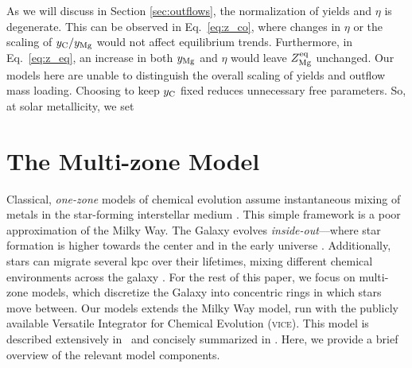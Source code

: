 \documentclass[fleqn,usenatbib]{mnras}
\newcommand{\JJ}{\citetalias{james+21}}
\newcommand{\VICE}{\textsc{vice}}
\begin{document}
As we will discuss in Section \ref{sec:outflows}, the normalization of yields and $\eta$ is degenerate. This can be observed in Eq.~\ref{eq:z_co}, where changes in $\eta$ or the scaling of $y_{\rm C}/y_{\rm Mg}$ would not affect equilibrium trends. Furthermore, in Eq.~\ref{eq:z_eq}, an increase in both $y_{\rm Mg}$ and $\eta$ would leave $Z_{\rm Mg}^{\rm eq}$ unchanged. Our models here are unable to distinguish the overall scaling of yields and outflow mass loading. Choosing to keep $y_{\rm C}$ fixed reduces unnecessary free parameters. So, at solar metallicity, we set


\section{The Multi-zone Model}\label{sec:vice}

Classical, \textit{one-zone} models of chemical evolution assume instantaneous mixing of metals in the star-forming interstellar medium \citep[e.g.][]{matteucci21}. This simple framework is a poor approximation of the Milky Way.  The Galaxy evolves \textit{inside-out}---where star formation is higher towards the center and in the early universe \citep{bird+13}. Additionally, stars can migrate several kpc over their lifetimes, mixing different chemical environments across the galaxy \citep{bird+12,sellwood+binney02}. For the rest of this paper, we focus on multi-zone models, which discretize the Galaxy into concentric rings in which stars move between.  
Our models extends the \citet[hereafter \JJ]{james+21} Milky Way model, run with the publicly available Versatile Integrator for Chemical Evolution (\VICE). 
This model is described extensively in \JJ~and concisely summarized  in \citet{james+23}. Here, we provide a brief overview of the relevant model components.
\end{document}
